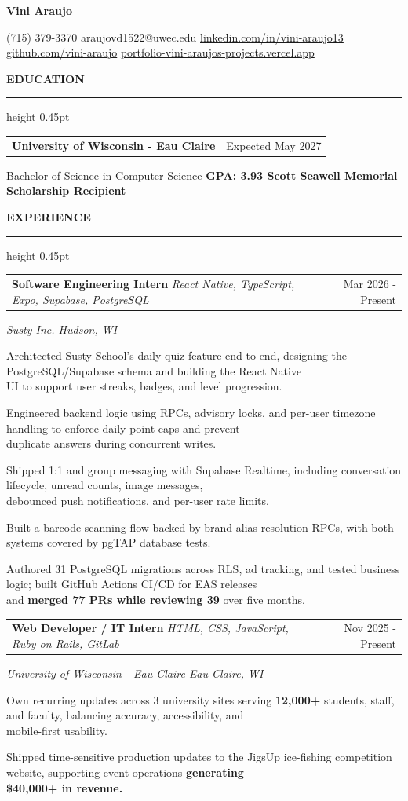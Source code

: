\documentclass[letterpaper,10pt]{article}
\makeatletter
\newcommand{\namefont}{\fontsize{17.06}{18.8}\selectfont\bfseries}
\newcommand{\contactfont}{\fontsize{8.54}{9.5}\selectfont}
\newcommand{\sectionfont}{\fontsize{9.96}{10.9}\selectfont\bfseries}
\newcommand{\entryfont}{\fontsize{9.48}{10.92}\selectfont}
\newcommand{\bulletfont}{\fontsize{9.00}{10.32}\selectfont}
\newcommand{\resumesection}[1]{%
  \vspace{2.15pt}%
  {\sectionfont #1}\par
  \vspace{0.15pt}\hrule height 0.45pt\vspace{4.45pt}%
}
\newcommand{\twocolrow}[2]{%
  \noindent\begin{tabular*}{\textwidth}{@{}l@{\extracolsep{\fill}}r@{}}
    #1 & #2
  \end{tabular*}\par
}
\newcommand{\resbullet}[1]{%
  {\bulletfont\noindent\hangindent=11.52pt\hangafter=1\makebox[11.52pt][l]{\textbullet\hspace{3.4pt}}#1\par\vspace{0.95pt}}%
}
\makeatother
\begin{document}
\vspace*{-5.9pt}
\begin{center}
  {\namefont Vini Araujo}\par
  \vspace{-1.65pt}
  {\contactfont
  (715) 379-3370 \textbar{} araujovd1522@uwec.edu \textbar{}
  \href{https://linkedin.com/in/vini-araujo13}{linkedin.com/in/vini-araujo13} \textbar{}
  \href{https://github.com/vini-araujo}{github.com/vini-araujo} \textbar{}
  \href{https://portfolio-vini-araujos-projects.vercel.app}{portfolio-vini-araujos-projects.vercel.app}}
\end{center}
\vspace{-8.7pt}

\resumesection{EDUCATION}
{\entryfont
\twocolrow{\textbf{University of Wisconsin - Eau Claire}}{Expected May 2027}
Bachelor of Science in Computer Science \textbf{\textbar{} GPA: 3.93 \textbar{} Scott Seawell Memorial Scholarship Recipient}\par
}

\resumesection{EXPERIENCE}
{\entryfont
\twocolrow{\textbf{Software Engineering Intern} \textit{\textbar{} React Native, TypeScript, Expo, Supabase, PostgreSQL}}{Mar 2026 - Present}
\textit{Susty Inc. \textbar{} Hudson, WI}\par
}
\resbullet{Architected Susty School's daily quiz feature end-to-end, designing the PostgreSQL/Supabase schema and building the React Native\\
UI to support user streaks, badges, and level progression.}
\resbullet{Engineered backend logic using RPCs, advisory locks, and per-user timezone handling to enforce daily point caps and prevent\\
duplicate answers during concurrent writes.}
\resbullet{Shipped 1:1 and group messaging with Supabase Realtime, including conversation lifecycle, unread counts, image messages,\\
debounced push notifications, and per-user rate limits.}
\resbullet{Built a barcode-scanning flow backed by brand-alias resolution RPCs, with both systems covered by pgTAP database tests.}
\resbullet{Authored 31 PostgreSQL migrations across RLS, ad tracking, and tested business logic; built GitHub Actions CI/CD for EAS releases\\
and \textbf{merged 77 PRs while reviewing 39} over five months.}

\vspace{0.25pt}
{\entryfont
\twocolrow{\textbf{Web Developer / IT Intern} \textit{\textbar{} HTML, CSS, JavaScript, Ruby on Rails, GitLab}}{Nov 2025 - Present}
\textit{University of Wisconsin - Eau Claire \textbar{} Eau Claire, WI}\par
}
\resbullet{Own recurring updates across 3 university sites serving \textbf{12,000+} students, staff, and faculty, balancing accuracy, accessibility, and\\
mobile-first usability.}
\resbullet{Shipped time-sensitive production updates to the JigsUp ice-fishing competition website, supporting event operations \textbf{generating}\\
\textbf{\$40,000+ in revenue.}}
\end{document}

